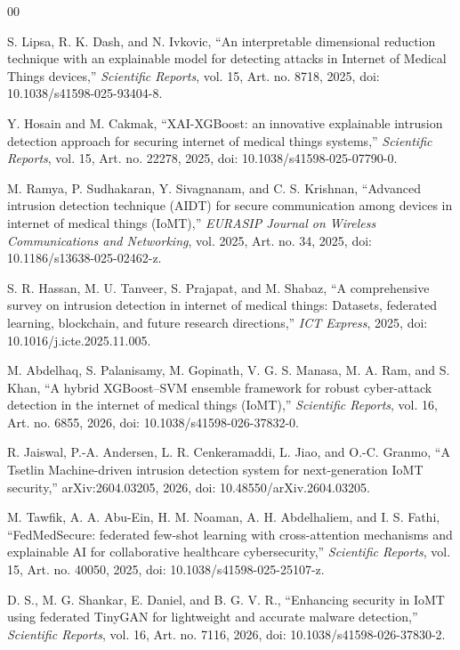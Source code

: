 \documentclass[conference, a4paper]{IEEEtran}
\begin{document}
\begin{thebibliography}{00}

S. Lipsa, R. K. Dash, and N. Ivkovic, ``An interpretable dimensional reduction technique with an explainable model for detecting attacks in Internet of Medical Things devices,'' \textit{Scientific Reports}, vol. 15, Art. no. 8718, 2025, doi: 10.1038/s41598-025-93404-8.

Y. Hosain and M. Cakmak, ``XAI-XGBoost: an innovative explainable intrusion detection approach for securing internet of medical things systems,'' \textit{Scientific Reports}, vol. 15, Art. no. 22278, 2025, doi: 10.1038/s41598-025-07790-0.

M. Ramya, P. Sudhakaran, Y. Sivagnanam, and C. S. Krishnan, ``Advanced intrusion detection technique (AIDT) for secure communication among devices in internet of medical things (IoMT),'' \textit{EURASIP Journal on Wireless Communications and Networking}, vol. 2025, Art. no. 34, 2025, doi: 10.1186/s13638-025-02462-z.

S. R. Hassan, M. U. Tanveer, S. Prajapat, and M. Shabaz, ``A comprehensive survey on intrusion detection in internet of medical things: Datasets, federated learning, blockchain, and future research directions,'' \textit{ICT Express}, 2025, doi: 10.1016/j.icte.2025.11.005.

M. Abdelhaq, S. Palanisamy, M. Gopinath, V. G. S. Manasa, M. A. Ram, and S. Khan, ``A hybrid XGBoost--SVM ensemble framework for robust cyber-attack detection in the internet of medical things (IoMT),'' \textit{Scientific Reports}, vol. 16, Art. no. 6855, 2026, doi: 10.1038/s41598-026-37832-0.

R. Jaiswal, P.-A. Andersen, L. R. Cenkeramaddi, L. Jiao, and O.-C. Granmo, ``A Tsetlin Machine-driven intrusion detection system for next-generation IoMT security,'' arXiv:2604.03205, 2026, doi: 10.48550/arXiv.2604.03205.

M. Tawfik, A. A. Abu-Ein, H. M. Noaman, A. H. Abdelhaliem, and I. S. Fathi, ``FedMedSecure: federated few-shot learning with cross-attention mechanisms and explainable AI for collaborative healthcare cybersecurity,'' \textit{Scientific Reports}, vol. 15, Art. no. 40050, 2025, doi: 10.1038/s41598-025-25107-z.

D. S., M. G. Shankar, E. Daniel, and B. G. V. R., ``Enhancing security in IoMT using federated TinyGAN for lightweight and accurate malware detection,'' \textit{Scientific Reports}, vol. 16, Art. no. 7116, 2026, doi: 10.1038/s41598-026-37830-2.


\end{thebibliography}
\end{document}
